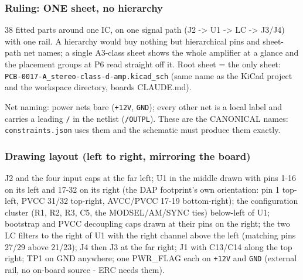 \documentclass[11pt]{article}
\begin{document}
\subsubsection*{Ruling: ONE sheet, no hierarchy}
38 fitted parts around one IC, on one signal path (J2 -\textgreater{} U1 -\textgreater{} LC -\textgreater{} J3/J4) with one rail. A hierarchy would buy nothing but hierarchical pins and sheet-path net names; a single A3-class sheet shows the whole amplifier at a glance and the placement groups at P6 read straight off it. Root sheet = the only sheet: \texttt{PCB-0017-A\_stereo-class-d-amp.kicad\_sch} (same name as the KiCad project and the workspace directory, boards CLAUDE.md).

Net naming: power nets bare (\texttt{+12V}, \texttt{GND}); every other net is a local label and carries a leading \texttt{/} in the netlist (\texttt{/OUTPL}). These are the CANONICAL names: \texttt{constraints.json} uses them and the schematic must produce them exactly.

\subsubsection*{Drawing layout (left to right, mirroring the board)}
J2 and the four input caps at the far left; U1 in the middle drawn with pins 1-16 on its left and 17-32 on its right (the DAP footprint's own orientation: pin 1 top-left, PVCC 31/32 top-right, AVCC/PVCC 17-19 bottom-right); the configuration cluster (R1, R2, R3, C5, the MODSEL/AM/SYNC ties) below-left of U1; bootstrap and PVCC decoupling caps drawn at their pins on the right; the two LC filters to the right of U1 with the right channel above the left (matching pins 27/29 above 21/23); J4 then J3 at the far right; J1 with C13/C14 along the top right; TP1 on GND anywhere; one PWR\_FLAG each on \texttt{+12V} and \texttt{GND} (external rail, no on-board source - ERC needs them).
\end{document}
